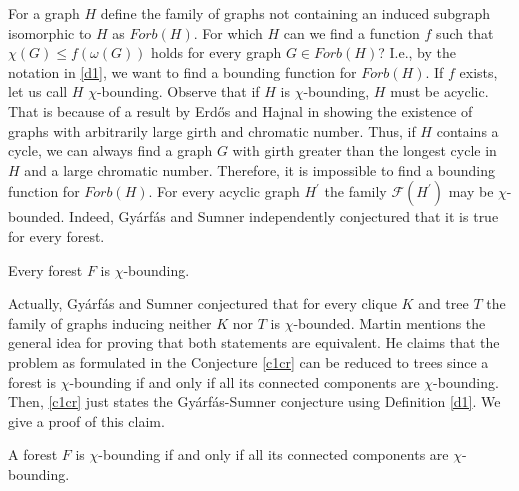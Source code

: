For a graph $H$ define the family of graphs not containing an induced subgraph isomorphic to $H$ as $\textit{Forb}(H)$. For which $H$ can we find a function $f$ such that $\chi (G)\leq f(\omega (G))$ holds for every graph $G\in\textit{Forb}(H)$? I.e., by the notation in \ref{d1}, we want to find a bounding function for $\textit{Forb}(H)$. If $f$ exists, let us call $H$ $\chi $-bounding. Observe that if $H$ is $\chi $-bounding, $H$ must be acyclic. That is because of a result by Erd\H{o}s and Hajnal in \cite{EH66} showing the existence of graphs with arbitrarily large girth and chromatic number. Thus, if $H$ contains a cycle, we can always find a graph $G$ with girth greater than the longest cycle in $H$ and a large chromatic number. Therefore, it is impossible to find a bounding function for $\textit{Forb}(H)$. For every acyclic graph $H^\prime$ the family $\mathcal{F}(H^\prime )$ may be $\chi$-bounded. Indeed, Gyárfás \cite{Gy75} and Sumner \cite{Su81} independently conjectured that it is true for every forest.

\begin{con}\label{c1cr}
Every forest $F$ is $\chi$-bounding.
\end{con}

Actually, Gyárfás and Sumner conjectured that for every clique $K$ and tree $T$ the family of graphs inducing neither $K$ nor $T$ is $\chi$-bounded. Martin \cite{Ma16} mentions the general idea for proving that both statements are equivalent. He claims that the problem as formulated in the Conjecture \ref{c1cr} can be reduced to trees since a forest is $\chi$-bounding if and only if all its connected components are $\chi$-bounding. Then, \ref{c1cr} just states the Gyárfás-Sumner conjecture using Definition \ref{d1}. We give a proof of this claim.

\begin{thm}
A forest $F$ is $\chi$-bounding if and only if all its connected components are $\chi$-bounding.
\end{thm}

